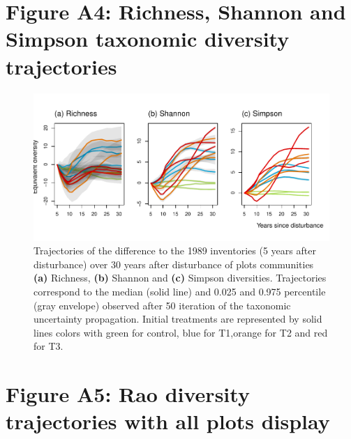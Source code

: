 \documentclass[fleqn,10pt]{ArtEcoFoG} %
\begin{document}
\section{\texorpdfstring{\textbf{Figure A4}: Richness, Shannon and
Simpson taxonomic diversity
trajectories}{Figure A4: Richness, Shannon and Simpson taxonomic diversity trajectories}}\label{figure-a4-richness-shannon-and-simpson-taxonomic-diversity-trajectories}

\begin{figure}

{\centering \includegraphics[width=1\linewidth]{AppendixI_files/figure-latex/DivTaxo-1} 

}

\caption{Trajectories of the difference to the 1989 inventories (5 years after disturbance) over 30 years after disturbance of plots communities \textbf{(a)} Richness, \textbf{(b)} Shannon and \textbf{(c)} Simpson diversities. Trajectories correspond to the median (solid line) and 0.025 and 0.975 percentile (gray envelope) observed after 50 iteration of the taxonomic uncertainty propagation. Initial treatments are represented by solid lines colors with green for control, blue for T1,orange for T2 and red for T3.}\label{fig:DivTaxo}
\end{figure}

\section{\texorpdfstring{\textbf{Figure A5}: Rao diversity trajectories
with all plots
display}{Figure A5: Rao diversity trajectories with all plots display}}\label{figure-a5-rao-diversity-trajectories-with-all-plots-display}
\end{document}
